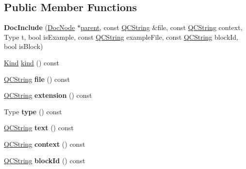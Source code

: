 \subsection*{Public Member Functions}
\begin{DoxyCompactItemize}
\item 
\mbox{\label{class_doc_include_aa2b842b9ef66473ffe9264f9aa307a37}} 
{\bfseries Doc\+Include} (\mbox{\hyperlink{class_doc_node}{Doc\+Node}} $\ast$\mbox{\hyperlink{class_doc_node_a73e8ad29a91cfceb0968eb00db71a23d}{parent}}, const \mbox{\hyperlink{class_q_c_string}{Q\+C\+String}} \&file, const \mbox{\hyperlink{class_q_c_string}{Q\+C\+String}} context, Type t, bool is\+Example, const \mbox{\hyperlink{class_q_c_string}{Q\+C\+String}} example\+File, const \mbox{\hyperlink{class_q_c_string}{Q\+C\+String}} block\+Id, bool is\+Block)
\item 
\mbox{\hyperlink{class_doc_node_aebd16e89ca590d84cbd40543ea5faadb}{Kind}} \mbox{\hyperlink{class_doc_include_a947c64f6a61138a4790ebc8bffbda3e3}{kind}} () const
\item 
\mbox{\label{class_doc_include_ad2dce3078cd4a33bf3923066b2c79957}} 
\mbox{\hyperlink{class_q_c_string}{Q\+C\+String}} {\bfseries file} () const
\item 
\mbox{\label{class_doc_include_a1201f943eb5e45821291843810df8a51}} 
\mbox{\hyperlink{class_q_c_string}{Q\+C\+String}} {\bfseries extension} () const
\item 
\mbox{\label{class_doc_include_a8e9f5167c504937dedc7ffac6a454514}} 
Type {\bfseries type} () const
\item 
\mbox{\label{class_doc_include_ab2a402fcaf6d3c4ecce0cd7647c0e339}} 
\mbox{\hyperlink{class_q_c_string}{Q\+C\+String}} {\bfseries text} () const
\item 
\mbox{\label{class_doc_include_afe43ae68ec1e5cb184ab7a3e63b40556}} 
\mbox{\hyperlink{class_q_c_string}{Q\+C\+String}} {\bfseries context} () const
\item 
\mbox{\label{class_doc_include_a0a32ad9c12a12a6664dd90ba2c141c26}} 
\mbox{\hyperlink{class_q_c_string}{Q\+C\+String}} {\bfseries block\+Id} () const

\end{DoxyCompactItemize}
